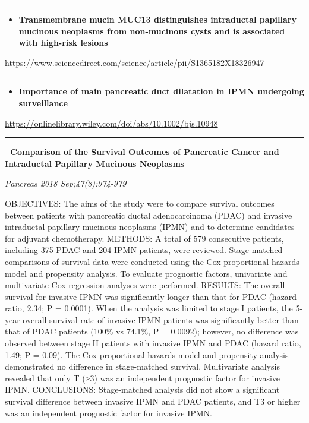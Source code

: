 \documentclass[]{article}
\providecommand{\tightlist}{%
  \setlength{\itemsep}{0pt}\setlength{\parskip}{0pt}}
\begin{document}
\begin{center}\rule{0.5\linewidth}{\linethickness}\end{center}

\begin{itemize}
\tightlist
\item
  \textbf{Transmembrane mucin MUC13 distinguishes intraductal papillary
  mucinous neoplasms from non-mucinous cysts and is associated with
  high-risk lesions}
\end{itemize}

\url{https://www.sciencedirect.com/science/article/pii/S1365182X18326947}

\begin{center}\rule{0.5\linewidth}{\linethickness}\end{center}

\begin{itemize}
\tightlist
\item
  \textbf{Importance of main pancreatic duct dilatation in IPMN
  undergoing surveillance}
\end{itemize}

\url{https://onlinelibrary.wiley.com/doi/abs/10.1002/bjs.10948}

\begin{center}\rule{0.5\linewidth}{\linethickness}\end{center}

 - \textbf{Comparison of the Survival Outcomes of Pancreatic Cancer and
Intraductal Papillary Mucinous Neoplasms}

\emph{Pancreas 2018 Sep;47(8):974-979}

OBJECTIVES: The aims of the study were to compare survival outcomes
between patients with pancreatic ductal adenocarcinoma (PDAC) and
invasive intraductal papillary mucinous neoplasms (IPMN) and to
determine candidates for adjuvant chemotherapy. METHODS: A total of 579
consecutive patients, including 375 PDAC and 204 IPMN patients, were
reviewed. Stage-matched comparisons of survival data were conducted
using the Cox proportional hazards model and propensity analysis. To
evaluate prognostic factors, univariate and multivariate Cox regression
analyses were performed. RESULTS: The overall survival for invasive IPMN
was significantly longer than that for PDAC (hazard ratio, 2.34; P =
0.0001). When the analysis was limited to stage I patients, the 5-year
overall survival rate of invasive IPMN patients was significantly better
than that of PDAC patients (100\% vs 74.1\%, P = 0.0092); however, no
difference was observed between stage II patients with invasive IPMN and
PDAC (hazard ratio, 1.49; P = 0.09). The Cox proportional hazards model
and propensity analysis demonstrated no difference in stage-matched
survival. Multivariate analysis revealed that only T (≥3) was an
independent prognostic factor for invasive IPMN. CONCLUSIONS:
Stage-matched analysis did not show a significant survival difference
between invasive IPMN and PDAC patients, and T3 or higher was an
independent prognostic factor for invasive IPMN.
\end{document}
